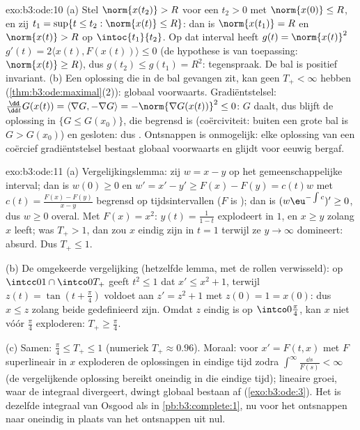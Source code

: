 \begin{solution}{exo:b3:ode:10}
(a) Stel $\norm{x(t_2)} > R$ voor een $t_2 > 0$ met $\norm{x(0)}
\leq R$, en zij $t_1 = \sup\{t \leq t_2 : \norm{x(t)} \leq R\}$:
dan is $\norm{x(t_1)} = R$ en $\norm{x(t)} > R$ op
$\intoc{t_1}{t_2}$. Op dat interval heeft $g(t) =
\norm{x(t)}^2$ $g'(t) = 2\langle x(t), F(x(t))\rangle \leq 0$ (de
hypothese is van toepassing: $\norm{x(t)} \geq R$), dus $g(t_2)
\leq g(t_1) = R^2$: tegenspraak. De bal is positief invariant.
(b) Een oplossing die in de  bal gevangen zit, kan geen
$T_+ < \infty$ hebben (\cref{thm:b3:ode:maximal}(2)): globaal
voorwaarts. Gradiëntstelsel: $\frac{\dd}{\dd t}G(x(t)) =
\langle\nabla G, -\nabla G\rangle = -\norm{\nabla G(x(t))}^2
\leq 0$: $G$ daalt, dus blijft de oplossing in $\{G \leq
G(x_0)\}$, die begrensd is (coërciviteit: buiten een grote bal is
$G > G(x_0)$) en gesloten: dus . Ontsnappen is onmogelijk:
elke oplossing van een coërcief gradiëntstelsel bestaat globaal
voorwaarts en glijdt voor eeuwig bergaf.
\end{solution}

\begin{solution}{exo:b3:ode:11}
(a) Vergelijkingslemma: zij $w = x - y$ op het gemeenschappelijke
interval; dan is $w(0) \geq 0$ en $w' = x' - y' \geq F(x) - F(y)
= c(t)w$ met $c(t) = \frac{F(x) - F(y)}{x - y}$ begrensd op
 tijdsintervallen ($F$ is ); dan is
$(w\eu^{-\int c})' \geq 0$, dus $w \geq 0$ overal. Met $F(x) =
x^2$: $y(t) = \frac1{1 - t}$ explodeert in $1$, en $x \geq y$
zolang $x$ leeft; was $T_+ > 1$, dan zou $x$ eindig zijn in $t =
1$ terwijl ze $y \to \infty$ domineert: absurd. Dus $T_+ \leq
1$.

(b) De omgekeerde vergelijking (hetzelfde lemma, met de rollen
verwisseld): op $\intcc01\cap\intco0{T_+}$ geeft $t^2 \leq 1$ dat
$x' \leq x^2 + 1$, terwijl $z(t) = \tan(t + \frac\pi4)$ voldoet
aan $z' = z^2 + 1$ met $z(0) = 1 = x(0)$: dus $x \leq z$ zolang
beide gedefinieerd zijn. Omdat $z$ eindig is op
$\intco0{\frac\pi4}$, kan $x$ niet vóór $\frac\pi4$ exploderen:
$T_+ \geq \frac\pi4$.

(c) Samen: $\frac\pi4 \leq T_+ \leq 1$ (numeriek $T_+ \approx
0.96$). Moraal: voor $x' = F(t, x)$ met $F$ superlineair in $x$
exploderen de oplossingen in eindige tijd zodra
$\int^\infty\frac{\dd s}{F(s)} < \infty$ (de vergelijkende
oplossing bereikt oneindig in die eindige tijd); lineaire groei,
waar de integraal divergeert, dwingt globaal bestaan af
(\cref{exo:b3:ode:3}). Het is dezelfde integraal van Osgood als
in \cref{pb:b3:complete:1}, nu voor het ontsnappen naar oneindig
in plaats van het ontsnappen uit nul.
\end{solution}

